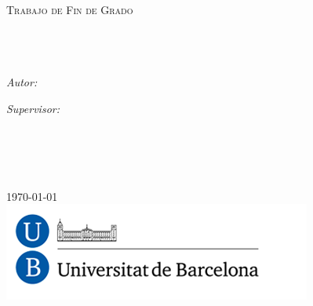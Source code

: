 \documentclass[11pt, oneside]{Thesis} %
\begin{document}
\begin{titlepage}
\begin{center}

\textsc{\LARGE \univname}\\[1.5cm] %
\textsc{\Large Trabajo de Fin de Grado}\\[0.5cm] %

\HRule \\[0.4cm] %
{\huge \bfseries \ttitle}\\[0.4cm] %
\HRule \\[1.5cm] %
 
\begin{minipage}{0.4\textwidth}
\begin{flushleft} \large
\emph{Autor:}\\
\href{https://es.linkedin.com/in/aaronnegrin}{\authornames} %
\end{flushleft}
\end{minipage}
\begin{minipage}{0.4\textwidth}
\begin{flushright} \large
\emph{Supervisor:} \\
\href{http://www.maia.ub.es/~anna/home.html}{\supname} %
\end{flushright}
\end{minipage}\\[3cm]

\textit{}\\[0.3cm] 
\textit{}\\[0.4cm]
\deptname\\[2cm] %
 
{\large \mydate\today}\\[4cm] %
\includegraphics[scale=0.5]{logo.png} %
 
\vfill
\end{center}

\end{titlepage}
\end{document}
